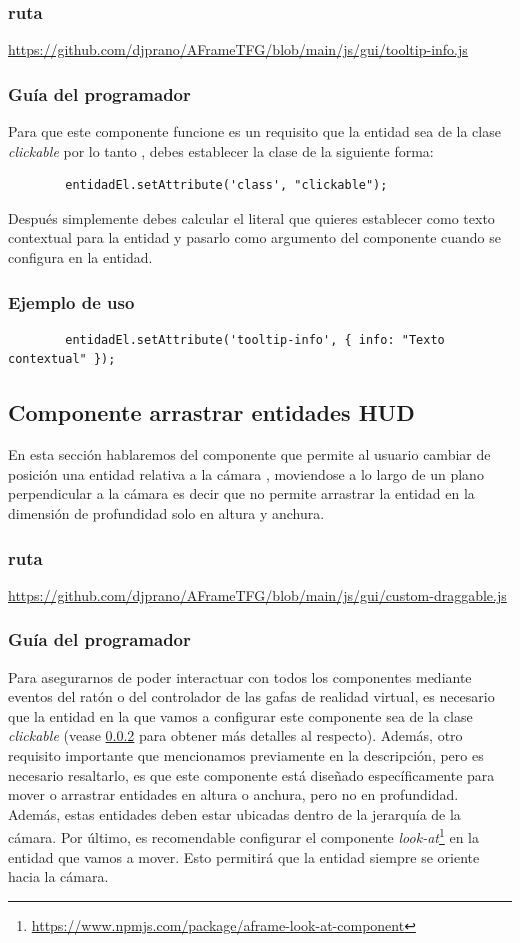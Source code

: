 \documentclass[a4paper, 11pt]{book}
\begin{document}
\subsubsection{ruta}
{\scriptsize
	\url{https://github.com/djprano/AFrameTFG/blob/main/js/gui/tooltip-info.js}
}

\subsubsection{Guía del programador}
\label{subsub:clickable}
Para que este componente funcione es un requisito que la entidad sea de la clase \emph{clickable} por lo tanto , debes establecer la clase de la siguiente forma:
{\scriptsize
	\begin{verbatim}
		entidadEl.setAttribute('class', "clickable");
	\end{verbatim}
}
Después simplemente debes calcular el literal que quieres establecer como texto contextual para la entidad y pasarlo como argumento del componente cuando se configura en la entidad.
\subsubsection{Ejemplo de uso}
{\scriptsize
	\begin{verbatim}
		entidadEl.setAttribute('tooltip-info', { info: "Texto contextual" });
	\end{verbatim}
}

\subsection{Componente arrastrar entidades HUD}
En esta sección hablaremos del componente que permite al usuario cambiar de posición una entidad relativa a la cámara , moviendose a lo largo de un plano perpendicular a la cámara es decir que no permite arrastrar la entidad en la dimensión de profundidad solo en altura y anchura. 
\subsubsection{ruta}
{\scriptsize
	\url{https://github.com/djprano/AFrameTFG/blob/main/js/gui/custom-draggable.js}
}
\subsubsection{Guía del programador}
Para asegurarnos de poder interactuar con todos los componentes mediante eventos del ratón o del controlador de las gafas de realidad virtual, es necesario que la entidad en la que vamos a configurar este componente sea de la clase \emph{clickable} (vease  \ref{subsub:clickable} para obtener más detalles al respecto).
Además, otro requisito importante que mencionamos previamente en la descripción, pero es necesario resaltarlo, es que este componente está diseñado específicamente para mover o arrastrar entidades en altura o anchura, pero no en profundidad. Además, estas entidades deben estar ubicadas dentro de la jerarquía de la cámara.
Por último, es recomendable configurar el componente \emph{look-at}\footnote{\url{https://www.npmjs.com/package/aframe-look-at-component}} en la entidad que vamos a mover. Esto permitirá que la entidad siempre se oriente hacia la cámara.
\end{document}
